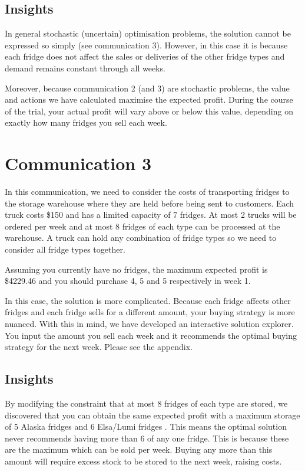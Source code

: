 \documentclass[11pt,a4paper]{article}
\begin{document}
\subsection{Insights}
In general stochastic (uncertain)
optimisation problems, the solution cannot be expressed so simply (see communication 3).
However, in this case it is because
each fridge does not affect the sales or deliveries of the other fridge types
and demand remains constant through all weeks.

Moreover, because communication 2 (and 3) are stochastic problems, 
the value and actions we have calculated maximise the expected profit. 
During the course of the trial, your actual profit will vary above or below
this value, depending on exactly how many fridges you sell each week.

\section{Communication 3}
In this communication, we need to consider the costs of transporting fridges to 
the storage warehouse where they are held before being sent to customers. 
Each truck costs \$150 and has a  limited capacity of 7 fridges. At most 2 trucks 
will be ordered per week and at most 8 fridges of each type can be processed 
at the warehouse. A truck can hold any combination of fridge types so we need 
to consider all fridge types together.

Assuming you currently have no fridges, the maximum expected profit is 
\$4229.46 and you should purchase 4, 5 and 5 respectively in week 1. 

In this case, the solution is more complicated. Because each fridge affects 
other fridges and each fridge sells for a different amount, your buying strategy 
is more nuanced. With this in mind, we have developed an interactive 
solution explorer. You input the amount you sell each week and it recommends 
the optimal buying strategy for the next week. Please see the appendix.

\subsection{Insights}
By modifying the constraint that at most 8 fridges of each type are stored, 
we discovered that you can obtain the same expected profit with a
maximum storage of 5 Alaska fridges and 6 Elsa/Lumi fridges . This means the optimal solution 
never recommends having more than 6 of any one fridge.
This is because these are the maximum which can be sold per week. Buying any more than this amount 
will require excess stock to be stored to the next week, raising costs. 
\end{document}
